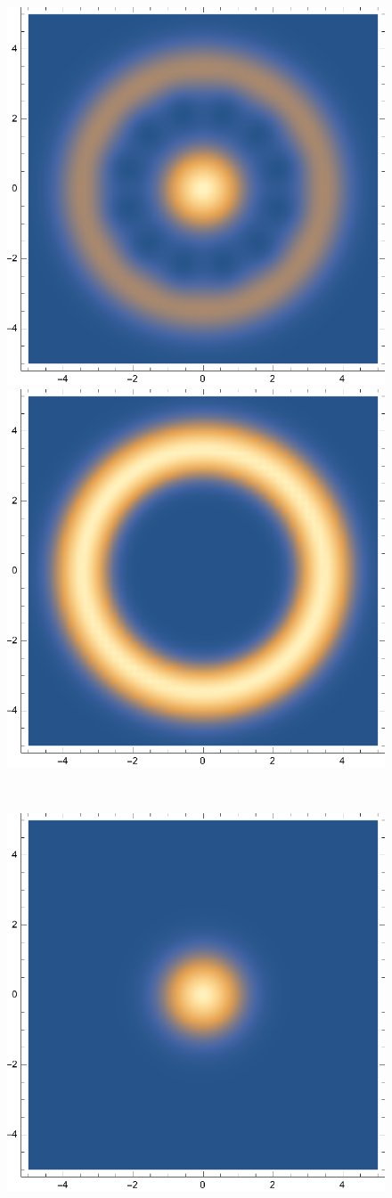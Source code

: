 \documentclass{article}
\theoremstyle{definition}
\begin{document}
\begin{enumerate}[label=\alph*)]
\begin{figure}[!htb]
\begin{minipage}{.24\textwidth}
  	\includegraphics[width=.7\linewidth]{figures/1-phi-0-theta-2pi3.eps}
	\end{minipage}
	\begin{minipage}{.24\textwidth}
  	\centering
  	\includegraphics[width=.7\linewidth]{figures/1-phi-0-theta-pi.eps}
	\end{minipage} \\
	\begin{minipage}{.24\textwidth}
  	\centering
  	\includegraphics[width=.7\linewidth]{figures/1-phi-pi-theta-0.eps}

\end{minipage}
\end{figure}
\end{enumerate}
\end{document}
